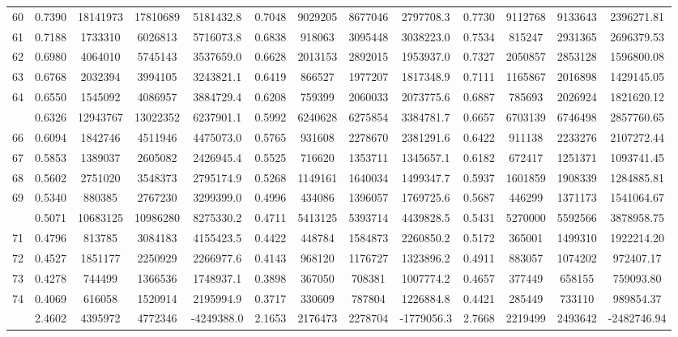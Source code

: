 \documentclass[
  12pt,
]{article}
\begin{document}
\begin{longtable}[t]{lcccccccccccc}
60 & 0.7390 & 18141973 & 17810689 & 5181432.8 & 0.7048 & 9029205 & 8677046 & 2797708.3 & 0.7730 & 9112768 & 9133643 & 2396271.81\\
61 & 0.7188 & 1733310 & 6026813 & 5716073.8 & 0.6838 & 918063 & 3095448 & 3038223.0 & 0.7534 & 815247 & 2931365 & 2696379.53\\
62 & 0.6980 & 4064010 & 5745143 & 3537659.0 & 0.6628 & 2013153 & 2892015 & 1953937.0 & 0.7327 & 2050857 & 2853128 & 1596800.08\\
63 & 0.6768 & 2032394 & 3994105 & 3243821.1 & 0.6419 & 866527 & 1977207 & 1817348.9 & 0.7111 & 1165867 & 2016898 & 1429145.05\\
64 & 0.6550 & 1545092 & 4086957 & 3884729.4 & 0.6208 & 759399 & 2060033 & 2073775.6 & 0.6887 & 785693 & 2026924 & 1821620.12\\
\addlinespace
65 & 0.6326 & 12943767 & 13022352 & 6237901.1 & 0.5992 & 6240628 & 6275854 & 3384781.7 & 0.6657 & 6703139 & 6746498 & 2857760.65\\
66 & 0.6094 & 1842746 & 4511946 & 4475073.0 & 0.5765 & 931608 & 2278670 & 2381291.6 & 0.6422 & 911138 & 2233276 & 2107272.44\\
67 & 0.5853 & 1389037 & 2605082 & 2426945.4 & 0.5525 & 716620 & 1353711 & 1345657.1 & 0.6182 & 672417 & 1251371 & 1093741.45\\
68 & 0.5602 & 2751020 & 3548373 & 2795174.9 & 0.5268 & 1149161 & 1640034 & 1499347.7 & 0.5937 & 1601859 & 1908339 & 1284885.81\\
69 & 0.5340 & 880385 & 2767230 & 3299399.0 & 0.4996 & 434086 & 1396057 & 1769725.6 & 0.5687 & 446299 & 1371173 & 1541064.67\\
\addlinespace
70 & 0.5071 & 10683125 & 10986280 & 8275330.2 & 0.4711 & 5413125 & 5393714 & 4439828.5 & 0.5431 & 5270000 & 5592566 & 3878958.75\\
71 & 0.4796 & 813785 & 3084183 & 4155423.5 & 0.4422 & 448784 & 1584873 & 2260850.2 & 0.5172 & 365001 & 1499310 & 1922214.20\\
72 & 0.4527 & 1851177 & 2250929 & 2266977.6 & 0.4143 & 968120 & 1176727 & 1323896.2 & 0.4911 & 883057 & 1074202 & 972407.17\\
73 & 0.4278 & 744499 & 1366536 & 1748937.1 & 0.3898 & 367050 & 708381 & 1007774.2 & 0.4657 & 377449 & 658155 & 759093.80\\
74 & 0.4069 & 616058 & 1520914 & 2195994.9 & 0.3717 & 330609 & 787804 & 1226884.8 & 0.4421 & 285449 & 733110 & 989854.37\\
\addlinespace
75 & 2.4602 & 4395972 & 4772346 & -4249388.0 & 2.1653 & 2176473 & 2278704 & -1779056.3 & 2.7668 & 2219499 & 2493642 & -2482746.94\\*
\end{longtable}
\endgroup{}
\end{document}
